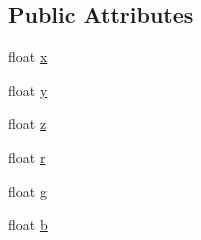 \subsection*{Public Attributes}
\begin{DoxyCompactItemize}
\item 
float \hyperlink{structijengine_1_1Vector3f_a62f586236d9e15cd6c95d354138f4362}{x}
\item 
float \hyperlink{structijengine_1_1Vector3f_a92ab51702f08a8dd02f7b5eecac5d16f}{y}
\item 
float \hyperlink{structijengine_1_1Vector3f_a79837bed7b540c2f5191ccb841e97b32}{z}
\item 
float \hyperlink{structijengine_1_1Vector3f_a0e7ca8f82170904af1d5132671e744b6}{r}
\item 
float \hyperlink{structijengine_1_1Vector3f_aed60781da1bd07f723e3afe4136bc0ce}{g}
\item 
float \hyperlink{structijengine_1_1Vector3f_a7e2ca78b9123dbfc1f2062e2bb8cb080}{b}
\end{DoxyCompactItemize}


